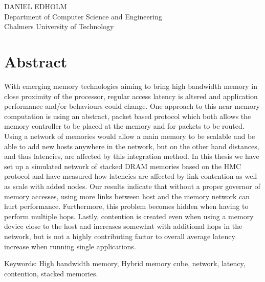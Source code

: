 \THETITLE\\
\TITLEDESCR\\
DANIEL EDHOLM\\
Department of Computer Science and Engineering\\
Chalmers University of Technology\\

\thispagestyle{plain}			%
\section*{Abstract}
With emerging memory technologies aiming to bring high bandwidth memory in close proximity of the processor, regular access latency is altered and application performance and/or behaviours could change. One approach to this near memory computation is using an abstract, packet based protocol which both allows the memory controller to be placed at the memory and for packets to be routed. Using a network of memories would allow a main memory to be scalable and be able to add new hosts anywhere in the network, but on the other hand distances, and thus latencies, are affected by this integration method. In this thesis we have set up a simulated network of stacked DRAM memories based on the HMC protocol and have measured how latencies are affected by link contention as well as scale with added nodes. Our results indicate that without a proper governor of memory accesses, using more links between host and the memory network can hurt performance. Furthermore, this problem becomes hidden when having to perform multiple hops. Lastly, contention is created even when using a memory device close to the host and increases somewhat with additional hops in the network, but is not a highly contributing factor to overall average latency increase when running single applications.

\vfill
Keywords: High bandwidth memory, Hybrid memory cube, network, latency, contention, stacked memories.

\newpage				%
\thispagestyle{empty}
\mbox{}